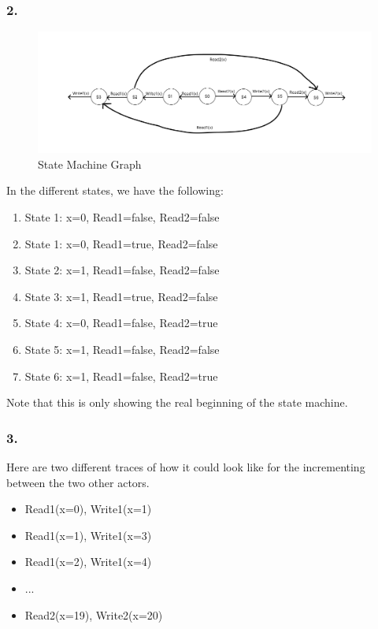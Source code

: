 \documentclass{article}
\begin{document}
\subsubsection*{2.}

\begin{figure}[h]
    \center
    \includegraphics[width=1\textwidth]{LaTex/images/Assignment2.png}
    \caption{State Machine Graph}
    \label{fig:Assignment2}
\end{figure}

In the different states, we have the following:

\begin{enumerate}
    \item State 1: x=0, Read1=false, Read2=false
    \item State 1: x=0, Read1=true, Read2=false
    \item State 2: x=1, Read1=false, Read2=false
    \item State 3: x=1, Read1=true, Read2=false
    \item State 4: x=0, Read1=false, Read2=true
    \item State 5: x=1, Read1=false, Read2=false
    \item State 6: x=1, Read1=false, Read2=true
\end{enumerate}

Note that this is only showing the real beginning of the state machine.


\subsubsection*{3.}
Here are two different traces of how it could look like for the incrementing between the two other actors.

\begin{itemize}
    \item Read1(x=0), Write1(x=1)
    \item Read1(x=1), Write1(x=3)
    \item Read1(x=2), Write1(x=4)
    \item ...
    \item Read2(x=19), Write2(x=20)
\end{itemize}
\end{document}
